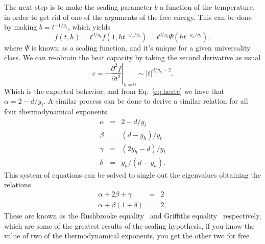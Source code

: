 The next step is to make the scaling parameter $b$ a function of the
temperature, in order to get rid of one of the arguments of the free energy.
This can be done by making $b=t^{-1/y_t}$, which yields
\begin{equation}
    f\left(t,h\right)=
    t^{d/y_{t}}f\left(1,ht^{-y_{h}/y_{t}}\right)=
    t^{d/y_{t}}\Psi\left(ht^{-y_{h}/y_{t}}\right),
\end{equation}
where $\Psi$ is known as a scaling function, and it's unique for a given
universality class. We can re-obtain the heat capacity by taking
the second derivative as usual
\begin{equation}
    c=-\left.\frac{\partial^2 f}{\partial t^2}\right|_{h=0}
    \sim \left|t\right|^{d/y_h-2}.
\end{equation}
Which is the expected behavior, and from Eq.~\ref{eq:heatc} we have that
$\alpha=2-d/y_t$. A similar process can be done to derive a similar relation
for all four thermodynamical exponents
\begin{eqnarray}
    \label{eq:scal1}
    \alpha & = & 2-d/y_{t}\\
    \beta  & = & \left(d-y_{h}\right)/y_{t}\\
    \gamma & = & \left(2y_{h}-d\right)/y_{t}\\
    \label{eq:scal2}
    \delta & = & y_{h}/\left(d-y_{h}\right).
\end{eqnarray}
This system of equations can be solved to single out the eigenvalues obtaining
the relations
\begin{eqnarray}
    \alpha+2\beta+\gamma              & = & 2\\
    \alpha+\beta\left(1+\delta\right) & = & 2,
\end{eqnarray}
These are known as the Rushbrooke equality~\cite{Rushbrooke1963} and Griffiths
equality~\cite{Griffiths1967} respectively,  which are some of the greatest
results of the scaling hypothesis, if you know the value of two of the
thermodynamical exponents, you get the other two for free.

